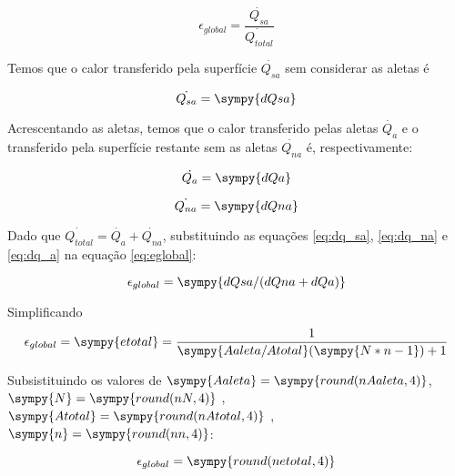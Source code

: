 \documentclass[a4paper,11pt]{article}
\newcommand{\npy}[1]{\sympy{round(n#1,4)}}
\begin{document}
\begin{equation}\label{eq:eglobal}
\epsilon_{global} = \frac{\dot{Q_{sa}}}{\dot{Q_{total}}}
\end{equation}

Temos que o calor transferido pela superfície $\dot{Q_{sa}}$ sem considerar as aletas é

\begin{equation}\label{eq:dq_sa}
\dot{Q_{sa}} = \sympy{dQsa}
\end{equation}

Acrescentando as aletas, temos que o calor transferido pelas aletas $\dot{Q_{a}}$ e o transferido pela superfície restante sem as aletas $\dot{Q_{na}}$ é, respectivamente:

\begin{equation}\label{eq:dq_a}
\dot{Q_{a}} = \sympy{dQa}
\end{equation}

\begin{equation}\label{eq:dq_na}
\dot{Q_{na}} = \sympy{dQna}
\end{equation}

Dado que $\dot{Q_{total}} = \dot{Q_a} + \dot{Q_{na}}$, substituindo as equações \ref{eq:dq_sa}, \ref{eq:dq_na} e \ref{eq:dq_a} na equação \ref{eq:eglobal}:

$$
\epsilon_{global} = \sympy{dQsa/(dQna+dQa)}
$$

Simplificando
\begin{equation}\label{eq:eglobal2}
\epsilon_{global} = \sympy{etotal} = \frac{1}{\sympy{Aaleta/Atotal}(\sympy{N*n -1})+1}
\end{equation}

Subsistituindo os valores de $\sympy{Aaleta} = \npy{Aaleta}$, $\sympy{N} = \npy{N}$ , $\sympy{Atotal} = \npy{Atotal}$ , $\sympy{n} = \npy{n}$:

$$
\epsilon_{global} = \npy{etotal}
$$

\end{document}
